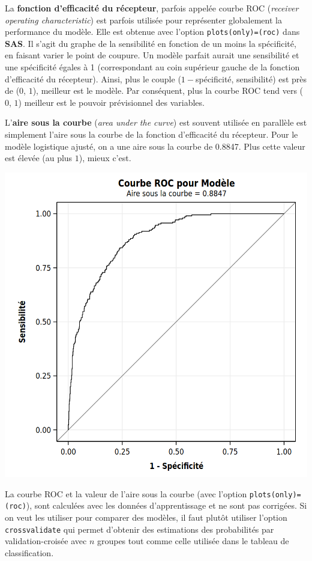 \documentclass[
  11pt,
  letterpaper,
]{book}
\theoremstyle{definition}
\theoremstyle{definition}
\theoremstyle{definition}
\theoremstyle{remark}
\begin{document}
La \textbf{fonction d'efficacité du récepteur}, parfois appelée courbe ROC (\emph{receiver operating characteristic}) est parfois utilisée pour représenter globalement la performance du modèle. Elle est obtenue avec l'option \texttt{plots(only)=(roc)} dans \textbf{SAS}. Il s'agit du graphe de la sensibilité en fonction de un moins la spécificité, en faisant varier le point de coupure. Un modèle parfait aurait une sensibilité et une spécificité égales à 1 (correspondant au coin supérieur gauche de la fonction d'efficacité du récepteur). Ainsi, plus le couple (\(1-\)spécificité, sensibilité) est près de (\(0\), \(1\)), meilleur est le modèle. Par conséquent, plus la courbe ROC tend vers (\(0\), \(1\)) meilleur est le pouvoir prévisionnel des variables.

L'\textbf{aire sous la courbe} (\emph{area under the curve}) est souvent utilisée en parallèle
est simplement l'aire sous la courbe de la fonction d'efficacité du récepteur. Pour le modèle logistique ajusté, on a une aire sous la courbe de 0.8847. Plus cette valeur est élevée (au plus \(1\)), mieux c'est.

\begin{center}\includegraphics[width=0.8\linewidth]{figures/03-logistic-e11} \end{center}

La courbe ROC et la valeur de l'aire sous la courbe (avec l'option \texttt{plots(only)=(roc)}), sont calculées avec les données d'apprentissage et ne sont pas corrigées. Si on veut les utiliser pour comparer des modèles, il faut plutôt utiliser l'option \texttt{crossvalidate} qui permet d'obtenir des estimations des probabilités par validation-croisée avec \(n\) groupes tout comme celle utilisée dans le tableau de classification.
\end{document}
